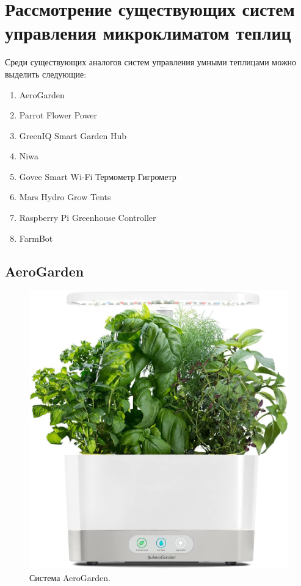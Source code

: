 \chapter{Рассмотрение существующих систем управления микроклиматом теплиц}

Среди существующих аналогов систем управления умными теплицами можно выделить следующие:

\begin{enumerate}
    \item AeroGarden
    \item Parrot Flower Power
    \item GreenIQ Smart Garden Hub
    \item Niwa
    \item Govee Smart Wi-Fi Термометр Гигрометр
    \item Mars Hydro Grow Tents
    \item Raspberry Pi Greenhouse Controller
    \item FarmBot
\end{enumerate}

\section{AeroGarden}

\begin{figure}[H]
    \centering
    \includegraphics[scale=0.35]{images/AeroGarden.png}
    \caption{Система AeroGarden.}
    \label{fig:AeroGarden}
\end{figure}

